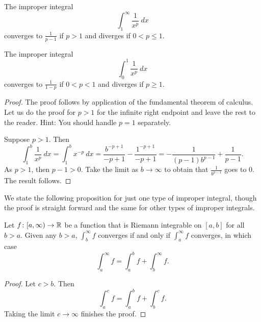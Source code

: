 \begin{prop}
\label{impropriemann:ptest}
The improper integral
\begin{equation*}
\int_1^\infty \frac{1}{x^p} ~dx
\end{equation*}
converges to $\frac{1}{p-1}$ if $p > 1$ and diverges if $0 < p \leq 1$.

The improper integral
\begin{equation*}
\int_0^1 \frac{1}{x^p} ~dx
\end{equation*}
converges to $\frac{1}{1-p}$ if $0 < p < 1$ and diverges if $p \geq 1$.
\end{prop}

\begin{proof}
The proof follows by application of the fundamental theorem of calculus.
Let us do the proof for $p > 1$ for the infinite right endpoint and
leave the rest to the reader.  Hint: You should handle $p=1$
separately.

Suppose $p > 1$.  Then
\begin{equation*}
\int_1^b \frac{1}{x^p} ~dx
=
\int_1^b x^{-p} ~dx
=
\frac{b^{-p+1}}{-p+1}
-
\frac{1^{-p+1}}{-p+1}
=
-
\frac{1}{(p-1)b^{p-1}}
+
\frac{1}{p-1} .
\end{equation*}
As $p > 1$, then $p-1 > 0$.  Take the limit as $b \to \infty$
to obtain that $\frac{1}{b^{p-1}}$ goes to 0.  The result follows.
\end{proof}

We state the following proposition for just one type
of improper integral, though the proof is straight
forward and the same for other types of improper integrals.

\begin{prop} \label{impropriemann:tail}
Let $f \colon [a,\infty) \to {\mathbb{R}}$ be a function
that is Riemann integrable on $[a,b]$ for all $b > a$.
Given any $b > a$,
$\int_b^\infty f$ converges if and only if $\int_a^\infty f$
converges, in which case
\begin{equation*}
\int_a^\infty f
=
\int_a^b f +
\int_b^\infty f .
\end{equation*}
\end{prop}

\begin{proof}
Let $c > b$.  Then
\begin{equation*}
\int_a^c f
=
\int_a^b f +
\int_b^c f .
\end{equation*}
Taking the limit $c \to \infty$ finishes the proof.
\end{proof}

